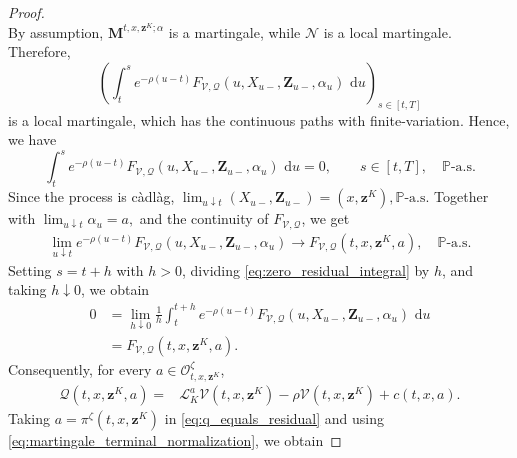 \documentclass[11pt]{article}
\theoremstyle{remarkitalic}
\theoremstyle{remarkitalic}
\newcommand{\dd}{\,\mathrm d}
\newcommand{\1}{\mathbf 1}
\begin{document}
\begin{proof}
\begin{equation*}
\end{equation*}
By assumption,
$\mathbf M^{t,x,\mathbf z^K;\alpha}$ is a martingale, while
$\mathcal N$ is a local martingale. Therefore, $$\left(\int_t^s
    e^{-\rho(u-t)}
    F_{\mathcal V,\mathcal Q}
    \left(
        u,X_{u-},\mathbf Z_{u-},\alpha_u
    \right)
    \,\dd u\right)_{s\in[t,T]}$$ is a local martingale, which has the continuous paths with finite-variation. Hence, we have
\begin{equation}
\label{eq:zero_residual_integral}
    \int_t^s
    e^{-\rho(u-t)}
    F_{\mathcal V,\mathcal Q}
    \left(
        u,X_{u-},\mathbf Z_{u-},\alpha_u
    \right)
    \,\dd u
    =
    0,
    \qquad
    s\in[t,T],
    \quad
    \mathbb P\text{-a.s.}
\end{equation} Since the process is c\`adl\`ag,  $\displaystyle \lim_{u\downarrow t}
    \left(
        X_{u-},\mathbf Z_{u-}
    \right)
    =
    \left(
        x,\mathbf z^K
    \right),
    \mathbb P\text{-a.s.}$
Together with $\displaystyle  \lim_{u\downarrow t}\alpha_u= a,$ and the continuity of $F_{\mathcal V,\mathcal Q}$, we get
$$\begin{aligned}
    \lim_{u\downarrow t} e^{-\rho(u-t)}
    F_{\mathcal V,\mathcal Q}
    \left(
        u,X_{u-},\mathbf Z_{u-},\alpha_u
    \right)
    \longrightarrow
    F_{\mathcal V,\mathcal Q}
    (t,x,\mathbf z^K,a),\quad 
    \mathbb P\text{-a.s.}
\end{aligned}$$ Setting $s = t+h$ with $h>0$, dividing \eqref{eq:zero_residual_integral} by $h$, and taking
$h\downarrow0$, we obtain
\begin{align*}
    0
    &=
    \lim_{h\downarrow0}
    \frac1h
    \int_t^{t+h}
    e^{-\rho(u-t)}
    F_{\mathcal V,\mathcal Q}
    \left(
        u,X_{u-},\mathbf Z_{u-},\alpha_u
    \right)
    \,\dd u
    \\
    &=
    F_{\mathcal V,\mathcal Q}
    (t,x,\mathbf z^K,a).
\end{align*}
Consequently, for every
$a\in\mathcal O^\zeta_{t,x,\mathbf z^K}$,
\begin{equation}
\label{eq:q_equals_residual}
\begin{aligned}
    \mathcal Q(t,x,\mathbf z^K,a)
    ={}&
    \mathcal L_K^a
    \mathcal V(t,x,\mathbf z^K)
    -
    \rho\mathcal V(t,x,\mathbf z^K)+
    c(t,x,a).
\end{aligned}
\end{equation} Taking
    $a=\pi^\zeta(t,x,\mathbf z^K)$
in \eqref{eq:q_equals_residual} and using
\eqref{eq:martingale_terminal_normalization}, we obtain

\end{proof}
\end{document}

